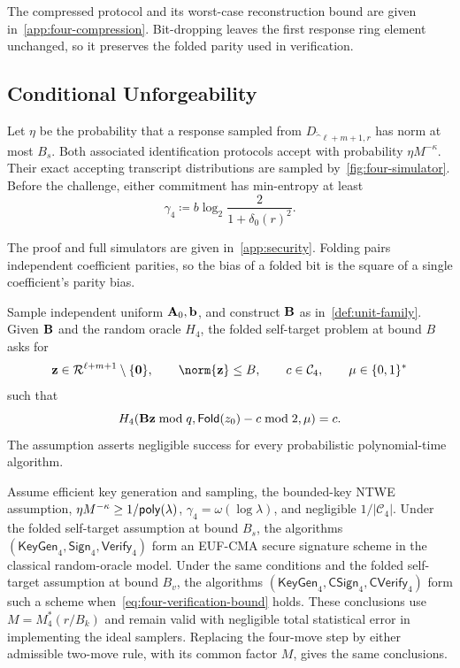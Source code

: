 The compressed protocol and its worst-case reconstruction bound are given in~\cref{app:four-compression}. Bit-dropping leaves the first response ring element unchanged, so it preserves the folded parity used in verification.

\subsection{Conditional Unforgeability}

\begin{lemma}
\label{lem:four-simulation}
Let $\eta$ be the probability that a response sampled from $D_{\ring^{\ell+m+1},r}$ has norm at most $B_s$. Both associated identification protocols accept with probability $\eta M^{-\kappa}$. Their exact accepting transcript distributions are sampled by~\cref{fig:four-simulator}. Before the challenge, either commitment has min-entropy at least
\begin{equation}
\label{eq:fold-entropy}
 \gamma_4\coloneqq b\log_2\frac{2}{1+\delta_0(r)^2}.
\end{equation}
\end{lemma}

The proof and full simulators are given in~\cref{app:security}. Folding pairs independent coefficient parities, so the bias of a folded bit is the square of a single coefficient's parity bias.

\begin{definition}
\label{def:quotient-self-target}
Sample independent uniform $\mathbf{A}_0,\mathbf{b}$, and construct $\mathbf{B}$ as in~\cref{def:unit-family}. Given $\mathbf{B}$ and the random oracle $H_4$, the folded self-target problem at bound $B$ asks for
\[
 \vec z\in\ring^{\ell+m+1}\setminus\{\vec0\},\qquad
 \norm{\vec z}\le B,\qquad c\in\mathcal C_4,\qquad\mu\in\{0,1\}^*
\]
such that
\[
 H_4(\mathbf{B}\mathbf{z}\bmod q,\mathsf{Fold}(z_0)-c\bmod2,\mu)=c.
\]
The assumption asserts negligible success for every probabilistic polynomial-time algorithm.
\end{definition}

\begin{theorem}
\label{thm:unit-security}
Assume efficient key generation and sampling, the bounded-key NTWE assumption, $\eta M^{-\kappa}\ge1/\mathsf{poly}(\lambda)$, $\gamma_4=\omega(\log\lambda)$, and negligible $1/|\mathcal C_4|$. Under the folded self-target assumption at bound $B_s$, the algorithms $(\mathsf{KeyGen}_4,\mathsf{Sign}_4,\mathsf{Verify}_4)$ form an EUF-CMA secure signature scheme in the classical random-oracle model. Under the same conditions and the folded self-target assumption at bound $B_v$, the algorithms $(\mathsf{KeyGen}_4,\mathsf{CSign}_4,\mathsf{CVerify}_4)$ form such a scheme when~\cref{eq:four-verification-bound} holds. These conclusions use $M=M_4^*(r/B_k)$ and remain valid with negligible total statistical error in implementing the ideal samplers. Replacing the four-move step by either admissible two-move rule, with its common factor $M$, gives the same conclusions.
\end{theorem}

